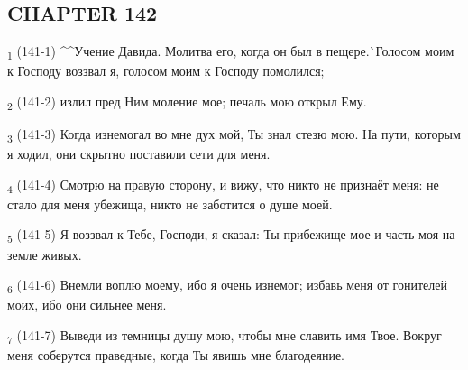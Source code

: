\subsection{CHAPTER 142}
\begin{tcolorbox}
\textsubscript{1} (141-1) ^^Учение Давида. Молитва его, когда он был в пещере.^^ Голосом моим к Господу воззвал я, голосом моим к Господу помолился;
\end{tcolorbox}
\begin{tcolorbox}
\textsubscript{2} (141-2) излил пред Ним моление мое; печаль мою открыл Ему.
\end{tcolorbox}
\begin{tcolorbox}
\textsubscript{3} (141-3) Когда изнемогал во мне дух мой, Ты знал стезю мою. На пути, которым я ходил, они скрытно поставили сети для меня.
\end{tcolorbox}
\begin{tcolorbox}
\textsubscript{4} (141-4) Смотрю на правую сторону, и вижу, что никто не признаёт меня: не стало для меня убежища, никто не заботится о душе моей.
\end{tcolorbox}
\begin{tcolorbox}
\textsubscript{5} (141-5) Я воззвал к Тебе, Господи, я сказал: Ты прибежище мое и часть моя на земле живых.
\end{tcolorbox}
\begin{tcolorbox}
\textsubscript{6} (141-6) Внемли воплю моему, ибо я очень изнемог; избавь меня от гонителей моих, ибо они сильнее меня.
\end{tcolorbox}
\begin{tcolorbox}
\textsubscript{7} (141-7) Выведи из темницы душу мою, чтобы мне славить имя Твое. Вокруг меня соберутся праведные, когда Ты явишь мне благодеяние.
\end{tcolorbox}
